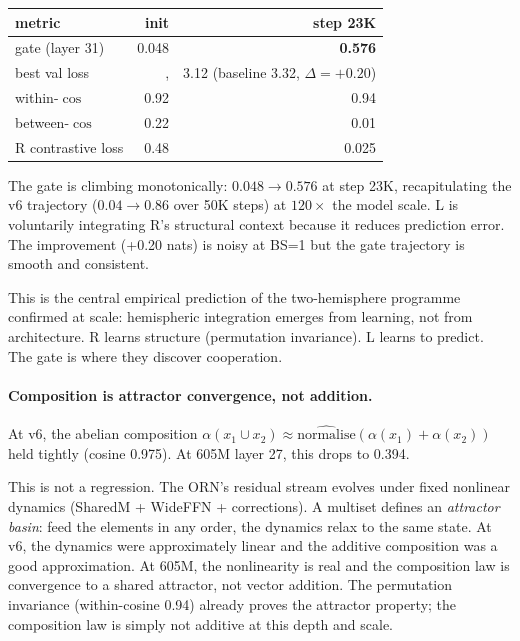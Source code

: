 \documentclass[11pt, a4paper]{article}
\theoremstyle{plain}
\theoremstyle{definition}
\theoremstyle{remark}
\begin{document}
\begin{center}
\small
\begin{tabular}{lrr}
\toprule
metric & init & step 23K \\
\midrule
gate (layer 31) & 0.048 & \textbf{0.576} \\
best val loss & ,  & 3.12 (baseline 3.32, $\Delta = +0.20$) \\
within-$\cos$ & 0.92 & 0.94 \\
between-$\cos$ & 0.22 & 0.01 \\
R contrastive loss & 0.48 & 0.025 \\
\bottomrule
\end{tabular}
\end{center}

The gate is climbing monotonically: $0.048 \to 0.576$ at step 23K, recapitulating the v6 trajectory ($0.04 \to 0.86$ over 50K steps) at $120\times$ the model scale. L is voluntarily integrating R's structural context because it reduces prediction error. The improvement (+0.20 nats) is noisy at BS=1 but the gate trajectory is smooth and consistent.

This is the central empirical prediction of the two-hemisphere programme confirmed at scale: hemispheric integration emerges from learning, not from architecture. R learns structure (permutation invariance). L learns to predict. The gate is where they discover cooperation.

\paragraph{Composition is attractor convergence, not addition.}

At v6, the abelian composition $\alpha(x_1 \cup x_2) \approx \hat{\mathrm{normalise}}(\alpha(x_1) + \alpha(x_2))$ held tightly (cosine 0.975). At 605M layer 27, this drops to 0.394.

This is not a regression. The ORN's residual stream evolves under fixed nonlinear dynamics (SharedM + WideFFN + corrections). A multiset defines an \emph{attractor basin}: feed the elements in any order, the dynamics relax to the same state. At v6, the dynamics were approximately linear and the additive composition was a good approximation. At 605M, the nonlinearity is real and the composition law is convergence to a shared attractor, not vector addition. The permutation invariance (within-cosine 0.94) already proves the attractor property; the composition law is simply not additive at this depth and scale.
\end{document}
